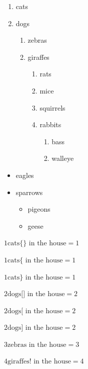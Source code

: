 \documentclass[
  a4paper,
]{article}
\providecommand{\tightlist}{%
  \setlength{\itemsep}{0pt}\setlength{\parskip}{0pt}}
\begin{document}
\begin{enumerate}
\def\labelenumi{\arabic{enumi}.}
\tightlist
\item
  cats
\item
  dogs

  \begin{enumerate}
  \def\labelenumii{\alph{enumii}.}
  \tightlist
  \item
    zebras
  \item
    giraffes

    \begin{enumerate}
    \def\labelenumiii{\roman{enumiii}.}
    \tightlist
    \item
      rats
    \item
      mice
    \item
      squirrels
    \item
      rabbits

      \begin{enumerate}
      \def\labelenumiv{\arabic{enumiv}.}
      \tightlist
      \item
        bass
      \item
        walleye
      \end{enumerate}
    \end{enumerate}
  \end{enumerate}
\end{enumerate}

\begin{itemize}
\tightlist
\item
  eagles
\item
  sparrows

  \begin{itemize}
  \tightlist
  \item
    pigeons
  \item
    geese
  \end{itemize}
\end{itemize}

\(1\text{cats\{{}\}{} in the house}= 1\)

\(1\text{cats\{{} in the house}= 1\)

\(1\text{cats\}{} in the house}= 1\)

\(2\text{dogs[] in the house}= 2\)

\(2\text{dogs[ in the house}= 2\)

\(2\text{dogs] in the house}= 2\)

\(3\text{zebras in the house}= 3\)

\(4\text{giraffes! in the house}= 4\)
\end{document}
